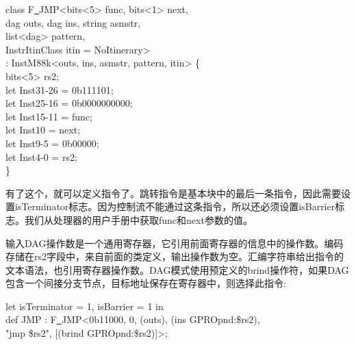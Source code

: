 \begin{tcolorbox}[colback=white,colframe=black]
class F\underline{~}JMP<bits<5> func, bits<1> next, \\
\hspace*{3cm}dag outs, dag ins, string asmstr, \\
\hspace*{3cm}list<dag> pattern, \\
\hspace*{3cm}InstrItinClass itin = NoItinerary> \\
\hspace*{1.3cm}: InstM88k<outs, ins, asmstr, pattern, itin> \{ \\
\hspace*{1cm}bits<5> rs2; \\
\hspace*{1cm}let Inst{31-26} = 0b111101; \\
\hspace*{1cm}let Inst{25-16} = 0b0000000000; \\
\hspace*{1cm}let Inst{15-11} = func; \\
\hspace*{1cm}let Inst{10} = next; \\
\hspace*{1cm}let Inst{9-5} = 0b00000; \\
\hspace*{1cm}let Inst{4-0} = rs2; \\
\}
\end{tcolorbox}

有了这个，就可以定义指令了。跳转指令是基本块中的最后一条指令，因此需要设置isTerminator标志。因为控制流不能通过这条指令，所以还必须设置isBarrier标志。我们从处理器的用户手册中获取func和next参数的值。\par

输入DAG操作数是一个通用寄存器，它引用前面寄存器的信息中的操作数。编码存储在rs2字段中，来自前面的类定义，输出操作数为空。汇编字符串给出指令的文本语法，也引用寄存器操作数。DAG模式使用预定义的brind操作符，如果DAG包含一个间接分支节点，目标地址保存在寄存器中，则选择此指令:\par

\begin{tcolorbox}[colback=white,colframe=black]
let isTerminator = 1, isBarrier = 1 in \\
\hspace*{1cm}def JMP : F\underline{~}JMP<0b11000, 0, (outs), (ins GPROpnd:\$rs2), \\
\hspace*{4cm}"jmp \$rs2", [(brind GPROpnd:\$rs2)]>;
\end{tcolorbox}

